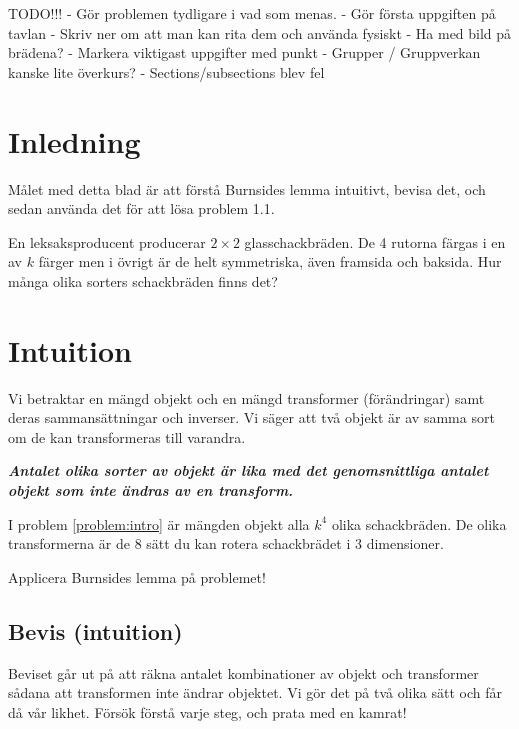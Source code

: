 	TODO!!!
- Gör problemen tydligare i vad som menas.
- Gör första uppgiften på tavlan
- Skriv ner om att man kan rita dem och använda fysiskt
- Ha med bild på brädena?
- Markera viktigast uppgifter med punkt
- Grupper / Gruppverkan kanske lite överkurs?
- Sections/subsections blev fel

\fi

\section{Inledning}
Målet med detta blad är att förstå Burnsides lemma intuitivt, bevisa det, och sedan använda det för att lösa problem 1.1.

\begin{problem} \label{problem:intro}
	En leksaksproducent producerar \(2 \times 2\) glasschackbräden. De 4 rutorna färgas i en av \(k\) färger men i övrigt är de helt symmetriska, även framsida och baksida. Hur många olika sorters schackbräden finns det?
\end{problem}

\section{Intuition}
\begin{sats} %
	Vi betraktar en mängd objekt och en mängd transformer (förändringar) samt deras sammansättningar och inverser. Vi säger att två objekt är av samma sort om de kan transformeras till varandra.

	\textit{\textbf{Antalet olika sorter av objekt är lika med det genomsnittliga antalet objekt som inte ändras av en transform.}}
\end{sats}

\begin{exempel}
	I problem \ref{problem:intro} är mängden objekt alla \(k^4\) olika schackbräden. De olika transformerna är de 8 sätt du kan rotera schackbrädet i 3 dimensioner.
\end{exempel}

\begin{problem}
	Applicera Burnsides lemma på problemet!
\end{problem}

\subsection{Bevis (intuition)}
Beviset går ut på att räkna antalet kombinationer av objekt och transformer sådana att transformen inte ändrar objektet. Vi gör det på två olika sätt och får då vår likhet. Försök förstå varje steg, och prata med en kamrat!

